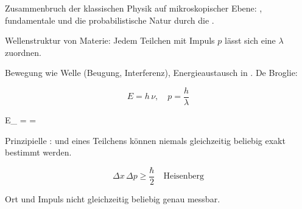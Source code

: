 

\begin{runintext}
Zusammenbruch der klassischen Physik auf mikroskopischer Ebene: , fundamentale  und die probabilistische Natur durch die .
\end{runintext}

\begin{runintext}
Wellenstruktur von Materie: Jedem Teilchen mit Impuls $p$ lässt sich eine  $\lambda$ zuordnen.
\end{runintext}
\begin{runintext}
Bewegung wie Welle (Beugung, Interferenz), Energieaustausch in . De Broglie:
\end{runintext}
\begin{formulabox}
\[ E = h\,\nu, \quad p = \frac{h}{\lambda} \]
\formulasep
\begin{longformula}
E_{} = 
\quad \Rightarrow \quad
\lambda = 
\quad {}
\end{longformula}
\end{formulabox}

\begin{runintext}
Prinzipielle :  und  eines Teilchens können niemals gleichzeitig beliebig exakt bestimmt werden.
\end{runintext}
\begin{formulabox}
\[ \Delta x\,\Delta p \ge \frac{\hbar}{2} \quad \text{Heisenberg} \]
\end{formulabox}
\begin{runintext}
Ort und Impuls nicht gleichzeitig beliebig genau messbar.
\end{runintext}

